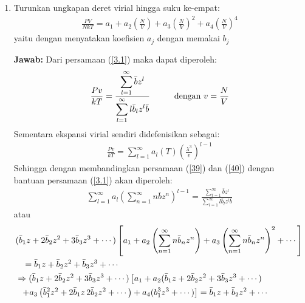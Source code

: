 \documentclass[a4paper , 12pt, cc]{article}
\begin{document}
\begin{enumerate}
\begin{enumerate}
\textbf{Jawab:} \newline
Anda dapat menggambar sendiri dengan mudah, kebetulan saya lagi mikirin algortimanya untuk menggenerate secara otomatis pake Tikz di \LaTeX 
\item Turunkan ungkapan deret virial hingga suku ke-empat:
\begin{align}
\frac{PV}{NkT}  = a_1 + a_2 \left( \frac{N}{V}\right) + a_3 \left( \frac{N}{V}\right)^2 + a_4 \left( \frac{N}{V}\right)^4 \label{3.1}
\end{align}
yaitu dengan menyatakan koefisien $a_j$ dengan memakai $b_j$ 

\textbf{Jawab:} \newline 
\newcommand{\fjr}{\displaystyle}
\newcommand{\bbar}{\bar{b}}
Dari persamaan (\ref{3.1}) maka dapat diperoleh:
\begin{align}
\frac{P v}{kT } = \frac{\fjr \sum_{l = 1}^\infty  \bbar z^l }{\fjr \sum_{l = 1}^{\infty } l \bbar_l z^l \bbar} \hspace{1 cm} \text{dengan }v =  \frac{N}{V} \label{39}
\end{align}
Sementara ekspansi virial sendiri didefenisikan sebagai:
\begin{align}
\frac{Pv}{kT} = \sum_{l = 1}^\infty a_l (T) \left( \frac{\lambda^3}{v}\right)^{l - 1 } \label{40}
\end{align}
Sehingga dengan membandingkan persamaan (\ref{39}) dan (\ref{40}) dengan bantuan persamaan (\ref{3.1}) akan diperoleh:
\begin{align}
\sum_{l = 1}^\infty a_l \left( \sum_{n = 1}^\infty n \bbar  z^n \right)^{l - 1}  =  \frac{\fjr \sum_{l = 1}^\infty  \bbar z^l }{\fjr \sum_{l = 1}^{\infty } l \bbar_l z^l \bbar}
\end{align}
atau 
\begin{align}
&(\bbar_1 z + 2 \bbar_2 z^2 + 3 \bbar_3 z^3  + \cdots )\left[ a_1 + a_2 \left( \sum_{n=1}^{\infty} n \bbar_n z^n \right) + a_3 \left( \sum_{n=1}^{\infty} n \bbar_n z^n \right)^2 + \cdots \right ] \nonumber \\
 & \hspace{0.3 cm } = \bbar_1 z + \bbar_2 z^2 + \bbar_3 z^3 +\cdots  \nonumber \\
 & \Rightarrow (\bbar_1 z + 2 \bbar_2 z^2 + 3 \bbar_3 z^3  + \cdots ) \left[ a_1  + a_2 (\bbar_1 z + 2 \bbar_2 z^2 + 3 \bbar_3 z^3 +  \cdots  ) \right . \nonumber \\ 
 & \hspace{ 0.2 cm } \left.  + a_3 \left( \bbar_1^2  z^2 + 2 \bbar_1 z\,  2 \bbar_2 z^2 + \cdots  \right) + a_4 (b_1^3 z^3 + \cdots  ) \right ]  = \bbar_1 z + \bbar_2 z^2 + \cdots \nonumber  

\end{align}
\end{enumerate}
\end{enumerate}
\end{document}
